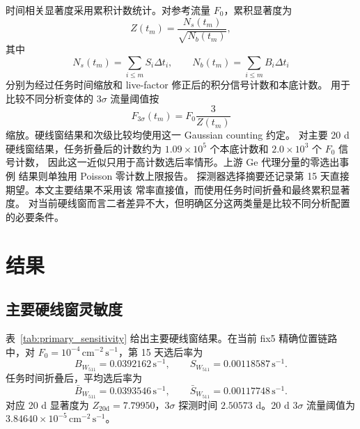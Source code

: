 \documentclass[preprint,12pt]{elsarticle}
\newcommand{\cms}{\,\mathrm{cm^{-2}\,s^{-1}}}
\newcommand{\cps}{\,\mathrm{s^{-1}}}
\newcommand{\wii}{W_{511}}
\newcommand{\fzero}{F_{0}}
\newcommand{\fthree}{F_{3\sigma}}
\begin{document}
时间相关显著度采用累积计数统计。对参考流量 $\fzero$，累积显著度为
\begin{equation}
  Z(t_m) = \frac{N_s(t_m)}{\sqrt{N_b(t_m)}},
\end{equation}
其中
\begin{equation}
  N_s(t_m)=\sum_{i\leq m}S_i\Delta t_i,\qquad
  N_b(t_m)=\sum_{i\leq m}B_i\Delta t_i
\end{equation}
分别为经过任务时间缩放和 live-factor 修正后的积分信号计数和本底计数。
用于比较不同分析变体的 $3\sigma$ 流量阈值按
\begin{equation}
  \fthree(t_m) = \fzero \frac{3}{Z(t_m)}
\end{equation}
缩放。硬线窗结果和次级比较均使用这一 Gaussian counting 约定。
对主要 20 d 硬线窗结果，任务折叠后的计数约为
$1.09\times10^5$ 个本底计数和 $2.0\times10^3$ 个 $\fzero$ 信号计数，
因此这一近似只用于高计数选后率情形。上游 Ge 代理分量的零选出事例
结果则单独用 Poisson 零计数上限报告。
探测器选择摘要还记录第 15 天直接期望。本文主要结果不采用该
常率直接值，而使用任务时间折叠和最终累积显著度。
对当前硬线窗而言二者差异不大，但明确区分这两类量是比较不同分析配置
的必要条件。

\section{结果}
\label{sec:results}

\subsection{主要硬线窗灵敏度}
\label{subsec:primary}

表~\ref{tab:primary_sensitivity} 给出主要硬线窗结果。在当前 fix5 精确位置链路中，对 $\fzero=10^{-4}\cms$，第 15 天选后率为
\begin{equation}
  B_{\wii}=0.0392162\cps,\qquad
  S_{\wii}=0.00118587\cps .
\end{equation}
任务时间折叠后，平均选后率为
\begin{equation}
  \bar{B}_{\wii}=0.0393546\cps,\qquad
  \bar{S}_{\wii}=0.00117748\cps .
\end{equation}
对应 20 d 显著度为 $Z_{20\mathrm{d}}=7.79950$，$3\sigma$ 探测时间 $2.50573$ d。20 d $3\sigma$ 流量阈值为 $3.84640\times10^{-5}\cms$。
\end{document}
